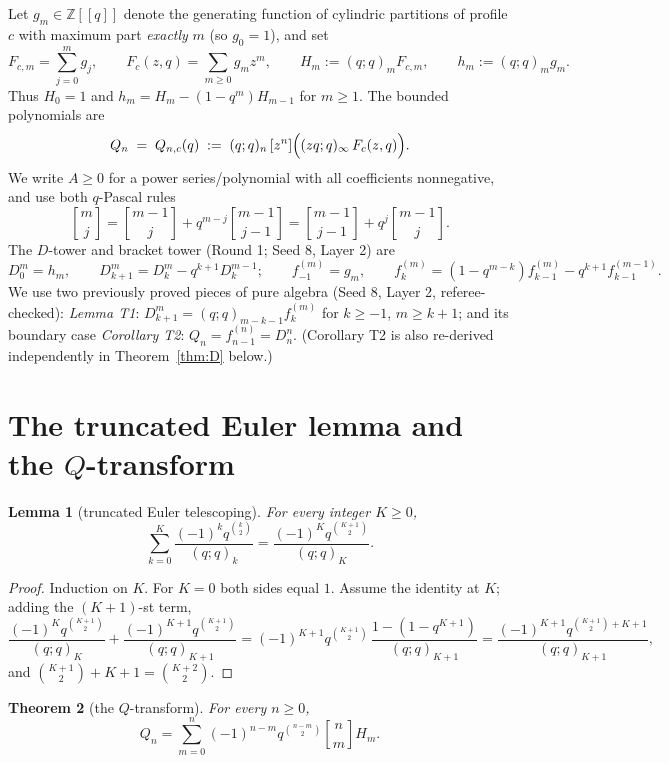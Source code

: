 \documentclass[11pt]{article}
\newtheorem{theorem}{Theorem}
\newtheorem{lemma}[theorem]{Lemma}
\newcommand{\qbin}[2]{\genfrac{[}{]}{0pt}{}{#1}{#2}}
\newcommand{\ZZ}{\mathbb{Z}}
\begin{document}
Let $g_m\in\ZZ[[q]]$ denote the generating function of cylindric partitions of profile $c$
with maximum part \emph{exactly} $m$ (so $g_0=1$), and set
\[
F_{c,m}=\sum_{j=0}^m g_j,\qquad
F_c(z,q)=\sum_{m\ge 0}g_m z^m,\qquad
H_m := (q;q)_m F_{c,m},\qquad
h_m := (q;q)_m g_m .
\]
Thus $H_0=1$ and $h_m = H_m-(1-q^m)H_{m-1}$ for $m\ge1$. The bounded polynomials are
\[
Q_n \;=\; Q_{n,c}(q)\;:=\;(q;q)_n\,[z^n]\Bigl((zq;q)_\infty\,F_c(z,q)\Bigr).
\]
We write $A\ge 0$ for a power series/polynomial with all coefficients nonnegative, and use
both $q$-Pascal rules
\begin{equation}\label{eq:pascal}
\qbin{m}{j}=\qbin{m-1}{j}+q^{m-j}\qbin{m-1}{j-1}
=\qbin{m-1}{j-1}+q^{j}\qbin{m-1}{j}.
\end{equation}
The $D$-tower and bracket tower (Round 1; Seed 8, Layer 2) are
\[
D_0^m=h_m,\qquad D_{k+1}^m=D_k^m-q^{k+1}D_k^{m-1};
\qquad
f_{-1}^{(m)}=g_m,\qquad
f_k^{(m)}=(1-q^{m-k})f_{k-1}^{(m)}-q^{k+1}f_{k-1}^{(m-1)} .
\]
We use two previously proved pieces of pure algebra
(Seed 8, Layer 2, referee-checked): \emph{Lemma T1}: $D_{k+1}^m=(q;q)_{m-k-1}f_k^{(m)}$
for $k\ge-1$, $m\ge k+1$; and its boundary case \emph{Corollary T2}: $Q_n=f_{n-1}^{(n)}=D_n^n$.
(Corollary T2 is also re-derived independently in Theorem~\ref{thm:D} below.)

\section{The truncated Euler lemma and the $Q$-transform}

\begin{lemma}[truncated Euler telescoping]\label{lem:E}
For every integer $K\ge 0$,
\[
\sum_{k=0}^{K}\frac{(-1)^k q^{\binom{k}{2}}}{(q;q)_k}
=\frac{(-1)^K q^{\binom{K+1}{2}}}{(q;q)_K}.
\]
\end{lemma}

\begin{proof}
Induction on $K$. For $K=0$ both sides equal $1$. Assume the identity at $K$; adding the
$(K{+}1)$-st term,
\[
\frac{(-1)^K q^{\binom{K+1}{2}}}{(q;q)_K}
+\frac{(-1)^{K+1} q^{\binom{K+1}{2}}}{(q;q)_{K+1}}
=(-1)^{K+1}q^{\binom{K+1}{2}}\,
\frac{1-(1-q^{K+1})}{(q;q)_{K+1}}
=\frac{(-1)^{K+1} q^{\binom{K+1}{2}+K+1}}{(q;q)_{K+1}},
\]
and $\binom{K+1}{2}+K+1=\binom{K+2}{2}$.
\end{proof}

\begin{theorem}[the $Q$-transform]\label{thm:Q}
For every $n\ge 0$,
\[
Q_n=\sum_{m=0}^{n}(-1)^{n-m}q^{\binom{n-m}{2}}\qbin{n}{m}H_m .
\]
\end{theorem}
\end{document}
